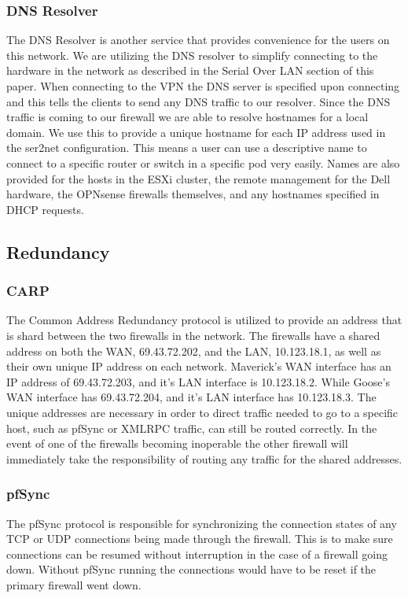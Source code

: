\documentclass[12pt]{IEEEtran}
\begin{document}
\subsubsection{DNS Resolver}
The DNS Resolver is another service that provides convenience for the users on this network. 
We are utilizing the DNS resolver to simplify connecting to the hardware in the network as described in the Serial Over LAN section of this paper. 
When connecting to the VPN the DNS server is specified upon connecting and this tells the clients to send any DNS traffic to our resolver. 
Since the DNS traffic is coming to our firewall we are able to resolve hostnames for a local domain.
We use this to provide a unique hostname for each IP address used in the ser2net configuration. 
This means a user can use a descriptive name to connect to a specific router or switch in a specific pod very easily.
Names are also provided for the hosts in the ESXi cluster, the remote management for the Dell hardware, the OPNsense firewalls themselves, and any hostnames specified in DHCP requests.

\subsection{Redundancy}
\subsubsection{CARP}
The Common Address Redundancy protocol is utilized to provide an address that is shard between the two firewalls in the network.
The firewalls have a shared address on both the WAN, 69.43.72.202, and the LAN, 10.123.18.1, as well as their own unique IP address on each network.
Maverick's WAN interface has an IP address of 69.43.72.203, and it's LAN interface is 10.123.18.2.
While Goose's WAN interface has 69.43.72.204, and it's LAN interface has 10.123.18.3. 
The unique addresses are necessary in order to direct traffic needed to go to a specific host, such as pfSync or XMLRPC traffic, can still be routed correctly. 
In the event of one of the firewalls becoming inoperable the other firewall will immediately take the responsibility of routing any traffic for the shared addresses.
\subsubsection{pfSync}
The pfSync protocol is responsible for synchronizing the connection states of any TCP or UDP connections being made through the firewall.
This is to make sure connections can be resumed without interruption in the case of a firewall going down. 
Without pfSync running the connections would have to be reset if the primary firewall went down. 
\end{document}
